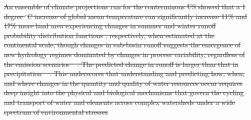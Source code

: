 \documentclass[preprint,review, 12pt]{elsarticle}
\providecommand{\DIFdel}[1]{{\protect\color{red}\sout{#1}}}                      %
\providecommand{\DIFaddbegin}{} %
\providecommand{\DIFdelbegin}{} %
\providecommand{\DIFdelend}{} %
\newcommand{\DIFscaledelfig}{0.5}
\newlength{\DIFdelgraphicswidth} %
\newlength{\DIFdelgraphicsheight} %
\newcommand{\DIFaddincludegraphics}[2][]{{\color{blue}\fbox{\DIFOincludegraphics[#1]{#2}}}} %
\newcommand{\DIFdelincludegraphics}[2][]{%
\sbox{\DIFdelgraphicsbox}{\DIFOincludegraphics[#1]{#2}}%
\settoboxwidth{\DIFdelgraphicswidth}{\DIFdelgraphicsbox} %
\settoboxtotalheight{\DIFdelgraphicsheight}{\DIFdelgraphicsbox} %
\scalebox{\DIFscaledelfig}{%
\parbox[b]{\DIFdelgraphicswidth}{\usebox{\DIFdelgraphicsbox}\\[-\baselineskip] \rule{\DIFdelgraphicswidth}{0em}}\llap{\resizebox{\DIFdelgraphicswidth}{\DIFdelgraphicsheight}{%
\setlength{\unitlength}{\DIFdelgraphicswidth}%
\begin{picture}(1,1)%
\thicklines\linethickness{2pt} %
{\color[rgb]{1,0,0}\put(0,0){\framebox(1,1){}}}%
{\color[rgb]{1,0,0}\put(0,0){\line( 1,1){1}}}%
{\color[rgb]{1,0,0}\put(0,1){\line(1,-1){1}}}%
\end{picture}%
}\hspace*{3pt}}} %
} %
\DeclareRobustCommand{\DIFaddbegin}{\DIFOaddbegin \let\includegraphics\DIFaddincludegraphics} %
\DeclareRobustCommand{\DIFdelbegin}{\DIFOdelbegin \let\includegraphics\DIFdelincludegraphics} %
\DeclareRobustCommand{\DIFdelend}{\DIFOaddend \let\includegraphics\DIFOincludegraphics} %
\begin{document}
\DIFdelbegin \DIFdel{An ensemble of climate projections run for the conterminous US showed that a 1 degree $^\circ$C increase of global mean temperature can significantly increase 11\% and 17\% more land area experiencing changes in summer and winter runoff probability distribution functions , respectively, when estimated at the continental scale, though changes in sub-basin runoff suggests the emergence of new hydrology regimes dominated by changes in process variability, regardless of the emission scenarios \mbox{%
\citep{Leng2016c}}\hspace{0pt}%
. The predicted change in runoff is larger than that in precipitation \mbox{%
\citep{Leng2016c}}\hspace{0pt}%
. This underscores that understanding and predicting how, when, and where changes in the quantity and quality of water resources occur requires deep insight into the physical and biological mechanisms that govern the cycling and transport of water and elements across complex watersheds under a wide spectrum of environmental stresses}\DIFdelend %
\DIFaddbegin 
\end{document}
